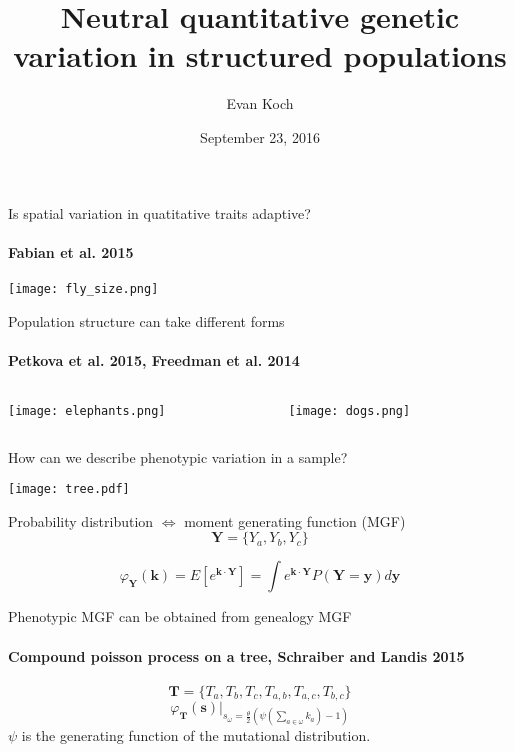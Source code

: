\documentclass{beamer}
\title[quant gen fun]{Neutral quantitative genetic variation in structured populations}
\author{Evan Koch}
\date{September 23, 2016}
\begin{document}
\frame{\titlepage}

\begin{frame}{Is spatial variation in quatitative traits adaptive?}
\framesubtitle{{\small Fabian et al. 2015}}
  \texttt{[image: fly\_size.png]}
\end{frame}

\begin{frame}{Population structure can take different forms}
  \framesubtitle{{\small Petkova et al. 2015, Freedman et al. 2014}}
  \begin{columns}
    \begin{column}{.5\columnwidth}
      \texttt{[image: elephants.png]}
    \end{column}
    \begin{column}{.5\columnwidth}
      \texttt{[image: dogs.png]}
    \end{column}
  \end{columns}
\end{frame}

\begin{frame}{How can we describe phenotypic variation in a sample?}

  \begin{center}
    \texttt{[image: tree.pdf]}
  \end{center}
\end{frame}

\begin{frame}{Probability distribution $\Leftrightarrow$ moment generating function (MGF)}
  \begin{equation}
    \label{eq:indivs}
    \mathbf{Y}=\{Y_a,Y_b,Y_c\}
  \end{equation}

  \begin{equation}
    \varphi_{\mathbf{Y}}(\mathbf{k}) = E\left[ e^{\mathbf{k} \cdot \mathbf{Y}} \right] =
    \int e^{\mathbf{k} \cdot \mathbf{Y}} P(\mathbf{Y}=\mathbf{y}) d\mathbf{y} \nonumber 
  \end{equation}
\end{frame}

\begin{frame}{Phenotypic MGF can be obtained from genealogy MGF}
  \framesubtitle{Compound poisson process on a tree, {\small Schraiber and Landis 2015}}
  \begin{equation}
    \label{eq:genealogy}
    \mathbf{T}=\{T_a,T_b,T_c,T_{a,b},T_{a,c},T_{b,c}\}
  \end{equation}
  \begin{equation}
    \label{eq:sub}
    \varphi_{\mathbf{T}}(\mathbf{s})\Bigr|_{s_{\omega}=\frac{\theta}{2} \left( \psi\left(\sum_{a \in \omega}k_{a}\right) -1 \right)} \nonumber 
  \end{equation}
  $\psi$ is the generating function of the mutational distribution.
\end{frame}
\end{document}
